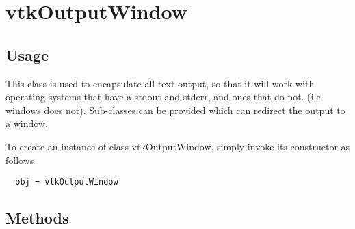 \section{vtkOutputWindow}

\subsection{Usage}

 This class is used to encapsulate all text output, so that it will work
 with operating systems that have a stdout and stderr, and ones that
 do not.  (i.e windows does not).  Sub-classes can be provided which can
 redirect the output to a window.

To create an instance of class vtkOutputWindow, simply
invoke its constructor as follows
\begin{verbatim}
  obj = vtkOutputWindow
\end{verbatim}
\subsection{Methods}

